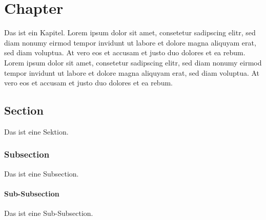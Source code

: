 \chapter{Chapter}
\label{ch:chapter}

Das ist ein Kapitel. Lorem ipsum dolor sit amet, consetetur sadipscing elitr, sed diam nonumy eirmod tempor invidunt ut labore et dolore magna aliquyam erat, sed diam voluptua. At vero eos et accusam et justo duo dolores et ea rebum. Lorem ipsum dolor sit amet, consetetur sadipscing elitr, sed diam nonumy eirmod tempor invidunt ut labore et dolore magna aliquyam erat, sed diam voluptua. At vero eos et accusam et justo duo dolores et ea rebum.

\section{Section}
\label{sec:section}

Das ist eine Sektion.

\subsection{Subsection}
\label{ssec:subsection}

Das ist eine Subsection.

\subsubsection{Sub-Subsection}
\label{sssec:subsection}

Das ist eine Sub-Subsection.
